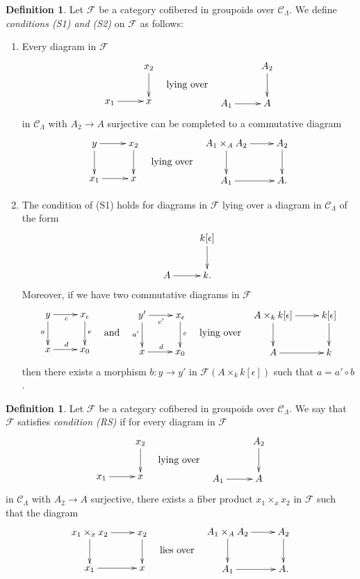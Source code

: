 \documentclass{amsart}
\theoremstyle{plain}
\theoremstyle{definition}
\newtheorem{definition}[subsection]{Definition}
\theoremstyle{remark}
\numberwithin{equation}{subsection}
\begin{document}
\begin{definition}
\label{definition-S1-S2}
Let $\mathcal{F}$ be a category cofibered in groupoids over $\mathcal
C_\Lambda$. We define {\it conditions (S1) and (S2)}
on $\mathcal{F}$ as follows:
\begin{enumerate}
\item[(S1)] Every diagram in $\mathcal{F}$
$$
\vcenter{
\xymatrix{
           & x_2 \ar[d] \\
x_1 \ar[r] & x
}
}
\quad\text{lying over}\quad
\vcenter{
\xymatrix{
           & A_2 \ar[d] \\
A_1 \ar[r] & A
}
}
$$
in $\mathcal{C}_\Lambda$ with $A_2 \to A$ surjective can be completed
to a commutative diagram
$$
\vcenter{
\xymatrix{
y \ar[r] \ar[d] & x_2 \ar[d] \\
x_1 \ar[r]      & x
}
}
\quad\text{lying over}\quad
\vcenter{
\xymatrix{
A_1 \times_A A_2 \ar[r] \ar[d] & A_2 \ar[d] \\
A_1 \ar[r]      & A.
}
}
$$
\item[(S2)]
The condition of (S1) holds for diagrams in $\mathcal{F}$ lying over
a diagram in $\mathcal{C}_\Lambda$ of the form
$$
\xymatrix{
          & k[\epsilon] \ar[d] \\
A  \ar[r] & k.
}
$$
Moreover, if we have two commutative diagrams in $\mathcal{F}$
$$
\vcenter{
\xymatrix{
y \ar[r]_c \ar[d]_a & x_\epsilon \ar[d]^e \\
x \ar[r]^d          & x_0
}
}
\quad\text{and}\quad
\vcenter{
\xymatrix{
y' \ar[r]_{c'} \ar[d]_{a'} & x_\epsilon \ar[d]^e \\
x \ar[r]^d                 & x_0
}
}
\quad\text{lying over}\quad
\vcenter{
\xymatrix{
A \times_k k[\epsilon] \ar[r] \ar[d] & k[\epsilon] \ar[d] \\
A  \ar[r] & k
}
}
$$
then there exists a morphism $b : y \to y'$ in
$\mathcal{F}(A \times_k k[\epsilon])$ such that $a = a' \circ b$.
\end{enumerate}
\end{definition}

\begin{definition}
\label{definition-RS}
Let $\mathcal{F}$ be a category cofibered in groupoids over $\mathcal
C_\Lambda$.  We say that $\mathcal{F}$ satisfies {\it condition (RS)}
if for every diagram in $\mathcal{F}$
$$
\vcenter{
\xymatrix{
           & x_2 \ar[d] \\
x_1 \ar[r] & x
}
}
\quad\text{lying over}\quad
\vcenter{
\xymatrix{
           & A_2 \ar[d] \\
A_1 \ar[r] & A
}
}
$$
in $\mathcal{C}_\Lambda$ with $A_2 \to A$ surjective, there exists a
fiber product $x_1 \times_x x_2$ in $\mathcal{F}$ such that the diagram
$$
\vcenter{
\xymatrix{
x_1 \times_x x_2 \ar[r] \ar[d] & x_2 \ar[d] \\
x_1 \ar[r]      & x
}
}
\quad\text{lies over}\quad
\vcenter{
\xymatrix{
A_1 \times_A A_2 \ar[r] \ar[d] & A_2 \ar[d] \\
A_1 \ar[r]      & A.
}
}
$$
\end{definition}
\end{document}
